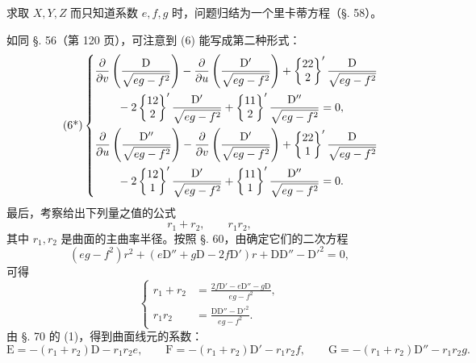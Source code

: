 求取 \(X,Y,Z\) 而只知道系数 \(e,f,g\) 时，问题归结为一个里卡蒂方程（\S. 58）。

如同 \S. 56（第 120 页），可注意到 (6) 能写成第二种形式：
\begin{equation}\tag{6*}
\left\{
\begin{aligned}
&\frac{\partial}{\partial v}\left(\frac{\mathrm D}{\sqrt{eg-f^2}}\right)
 -\frac{\partial}{\partial u}\left(\frac{\mathrm D'}{\sqrt{eg-f^2}}\right)
 +\left\{\begin{matrix}22\\2\end{matrix}\right\}'\frac{\mathrm D}{\sqrt{eg-f^2}}\\
&\qquad{}-2\left\{\begin{matrix}12\\2\end{matrix}\right\}'\frac{\mathrm D'}{\sqrt{eg-f^2}}
 +\left\{\begin{matrix}11\\2\end{matrix}\right\}'\frac{\mathrm D''}{\sqrt{eg-f^2}}=0,\\
&\frac{\partial}{\partial u}\left(\frac{\mathrm D''}{\sqrt{eg-f^2}}\right)
 -\frac{\partial}{\partial v}\left(\frac{\mathrm D'}{\sqrt{eg-f^2}}\right)
 +\left\{\begin{matrix}22\\1\end{matrix}\right\}'\frac{\mathrm D}{\sqrt{eg-f^2}}\\
&\qquad{}-2\left\{\begin{matrix}12\\1\end{matrix}\right\}'\frac{\mathrm D'}{\sqrt{eg-f^2}}
 +\left\{\begin{matrix}11\\1\end{matrix}\right\}'\frac{\mathrm D''}{\sqrt{eg-f^2}}=0.
\end{aligned}\right.
\end{equation}
最后，考察给出下列量之值的公式
\[
 r_1+r_2,\qquad r_1r_2,
\]
其中 \(r_1,r_2\) 是曲面的主曲率半径。按照 \S. 60，由确定它们的二次方程
\begin{equation}\tag{7}
 (eg-f^2)r^2+(e\mathrm D''+g\mathrm D-2f\mathrm D')r+\mathrm D\mathrm D''-\mathrm D'^2=0,
\end{equation}
可得
\begin{equation}\tag{8}
\left\{
\begin{aligned}
 r_1+r_2&=\frac{2f\mathrm D'-e\mathrm D''-g\mathrm D}{eg-f^2},\\
 r_1r_2&=\frac{\mathrm D\mathrm D''-\mathrm D'^2}{eg-f^2}.
\end{aligned}\right.
\end{equation}
由 \S. 70 的 (1)，得到曲面线元的系数：
\begin{equation}\tag{9}
 \mathrm E=-(r_1+r_2)\mathrm D-r_1r_2 e,\qquad
 \mathrm F=-(r_1+r_2)\mathrm D'-r_1r_2 f,\qquad
 \mathrm G=-(r_1+r_2)\mathrm D''-r_1r_2 g.
\end{equation}


